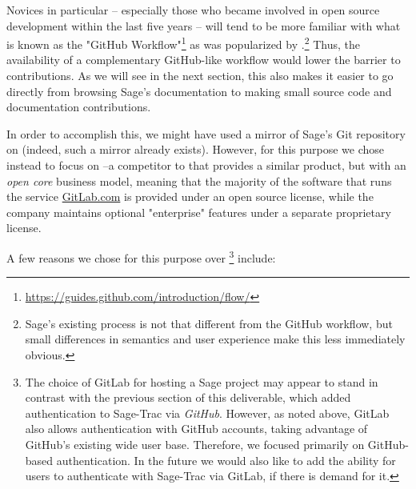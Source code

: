Novices in particular -- especially those who became involved in open source
development within the last five years -- will tend to be more familiar with what
is known as the "GitHub
Workflow"\footnote{\url{https://guides.github.com/introduction/flow/}} as was
popularized by \GitHub.\footnote{Sage's existing process is not that different
from the GitHub workflow, but small differences in semantics and user
experience make this less immediately obvious.} Thus, the availability of a
complementary GitHub-like workflow would lower the barrier to contributions.
As we will see in the next section, this also makes it easier to go directly
from browsing Sage's documentation to making small source code and
documentation contributions.

In order to accomplish this, we might have used a mirror of Sage's Git
repository on \GitHub (indeed, such a mirror already exists).  However, for
this purpose we chose instead to focus on \GitLab--a competitor to \GitHub that
provides a similar product, but with an {\em open core} business model, meaning
that the majority of the software that runs the service \url{GitLab.com} is
provided under an open source license, while the company maintains optional
"enterprise" features under a separate proprietary license.

A few reasons we chose \GitLab for this purpose over \GitHub \footnote{The
choice of GitLab for hosting a Sage project may appear to stand in contrast
with the previous section of this deliverable, which added authentication to
Sage-Trac via {\em GitHub}.  However, as noted above, GitLab also allows
authentication with GitHub accounts, taking advantage of GitHub's existing wide
user base.  Therefore, we focused primarily on GitHub-based authentication.  In
the future we would also like to add the ability for users to authenticate with
Sage-Trac via GitLab, if there is demand for it.} include:

